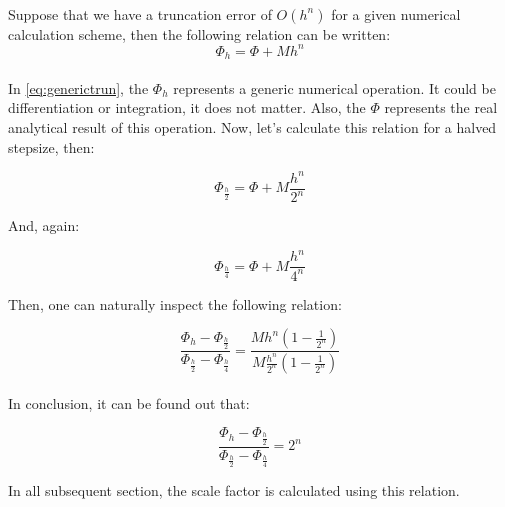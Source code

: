 \documentclass[letterpaper,12pt]{article}
\begin{document}
\paragraph{} Suppose that we have a truncation error of $O(h^n)$ for a given numerical calculation scheme, then the following relation can be written:
\begin{equation*}
    \label{eq:generictrun}
    \Phi_h = \Phi + Mh^n    
\end{equation*} 
\paragraph{} In \eqref{eq:generictrun}, the $\Phi_h$ represents a generic numerical operation. It could be differentiation or integration, it does not matter. Also, the $\Phi$ represents the real analytical result of this operation. Now, let's calculate this relation for a halved stepsize, then:

\begin{equation*}
    \Phi_{\frac{h}{2}} = \Phi + M\frac{h^n}{2^n}
\end{equation*}

And, again:

\begin{equation*}
    \Phi_{\frac{h}{4}} = \Phi + M\frac{h^n}{4^n} 
\end{equation*}

Then, one can naturally inspect the following relation:

\begin{equation*}
    \frac{\Phi_h - \Phi_{\frac{h}{2}}}{\Phi_{\frac{h}{2}} - \Phi_{\frac{h}{4}}} = \frac{Mh^n\left(1 - \frac{1}{2^n}\right)}{M\frac{h^n}{2^n}\left(1 - \frac{1}{2^n}\right)}
\end{equation*}
\paragraph{} In conclusion, it can be found out that:

\begin{equation*}
    \frac{\Phi_h - \Phi_{\frac{h}{2}}}{\Phi_{\frac{h}{2}} - \Phi_{\frac{h}{4}}} = 2^n
\end{equation*}

In all subsequent section, the scale factor is calculated using this relation.
\end{document}
